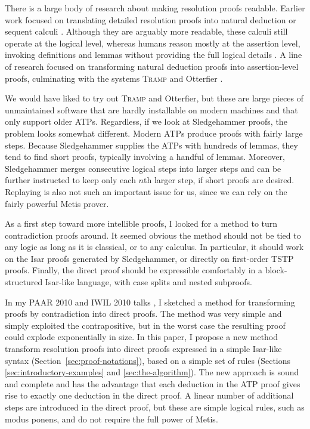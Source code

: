 \documentclass[withtimes,a4paper,12pt]{easychair}
\begin{document}
There is a large body of research about making resolution proofs
readable. Earlier work focused on translating detailed resolution
proofs into natural deduction or sequent calculi \cite{xxx, etc.}.
Although they are arguably more readable, these calculi still operate
at the logical level, whereas humans reason mostly at the assertion
level, invoking definitions and lemmas without providing the full
logical details \cite{huang-xxx}. A line of research focused on
transforming natural deduction proofs into assertion-level proofs,
culminating with the systems \textsc{Tramp} \cite{xxx} and Otterfier
\cite{zimmer-et-al-2004}.

We would have liked to try out \textsc{Tramp} and Otterfier, but these
are large pieces of unmaintained software that are hardly installable
on modern machines and that only support older ATPs. Regardless, if we
look at Sledgehammer proofs, the problem looks somewhat different.
Modern ATPs produce proofs with fairly large steps. Because
Sledgehammer supplies the ATPs with hundreds of lemmas, they tend to
find short proofs, typically involving a handful of lemmas. Moreover,
Sledgehammer merges consecutive logical steps into larger steps and
can be further instructed to keep only each $n$th larger step, if
short proofs are desired. Replaying is also not such an important
issue for us, since we can rely on the fairly powerful Metis prover.

As a first step toward more intellible proofs, I looked for a method
to turn contradiction proofs around. It seemed obvious the
method should not be tied to any logic as long as it is classical, or
to any calculus. In particular, it should work on the Isar proofs
generated by Sledgehammer, or directly on first-order TSTP proofs.
Finally, the direct proof should be expressible comfortably in a
block-structured Isar-like language, with case splits and nested
subproofs.

In my PAAR 2010 and IWIL 2010 talks \cite{xxx,xxx}, I sketched a
method for transforming proofs by contradiction into direct proofs.
The method was very simple and simply exploited the contrapositive,
but in the worst case the resulting proof could explode exponentially
in size. In this paper, I propose a new method transform resolution
proofs into direct proofs expressed in a simple Isar-like syntax
(Section~\ref{sec:proof-notations}), based on a simple set of rules
(Sections \ref{sec:introductory-examples} and
\ref{sec:the-algorithm}). The new approach is sound and complete and
has the advantage that each deduction in the ATP proof
gives rise to exactly one deduction in the direct proof. A linear
number of additional steps are introduced in the direct proof, but
these are simple logical rules, such as modus ponens, and do not
require the full power of Metis.
\end{document}
